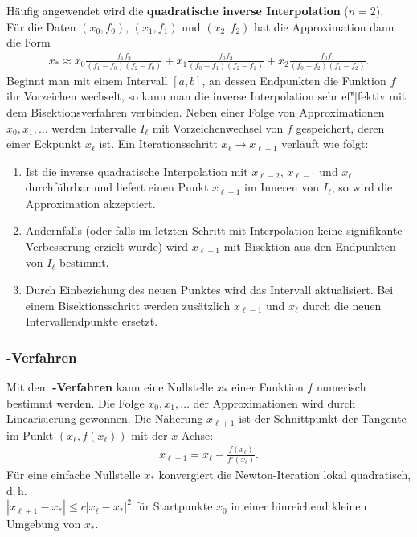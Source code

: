 Häufig angewendet wird die
\textbf{quadratische inverse Interpolation} ($n = 2$). \\
Für die Daten $(x_0, f_0)$, $(x_1, f_1)$ und $(x_2, f_2)$ hat die
Approximation dann die Form
\begin{align*}
    x_\ast \approx
    x_0 \frac{f_1 f_2}{(f_1 - f_0)(f_2 - f_0)} +
    x_1 \frac{f_0 f_2}{(f_0 - f_1)(f_2 - f_1)} +
    x_2 \frac{f_0 f_1}{(f_0 - f_2)(f_1 - f_2)}.
\end{align*}
Beginnt man mit einem Intervall $[a, b]$, an dessen Endpunkten
die Funktion $f$ ihr Vorzeichen wechselt, so kann man die inverse Interpolation
sehr ef"|fektiv mit dem Bisektionsverfahren verbinden.
Neben einer Folge von Approximationen $x_0, x_1, \dotsc$ werden Intervalle
$I_\ell$ mit Vorzeichenwechsel von $f$ gespeichert, deren einer
Eckpunkt $x_\ell$ ist. Ein Iterationsschritt $x_\ell \rightarrow x_{\ell+1}$
verläuft wie folgt:
\begin{enumerate}
    \item
    Ist die inverse quadratische Interpolation mit $x_{\ell-2}$, $x_{\ell-1}$
    und $x_\ell$ durchführbar und liefert einen Punkt $x_{\ell+1}$ im Inneren
    von $I_\ell$, so wird die Approximation akzeptiert.
    
    \item
    Andernfalls (oder falls im letzten Schritt mit Interpolation keine
    signifikante Verbesserung erzielt wurde) wird $x_{\ell+1}$ mit Bisektion
    aus den Endpunkten von $I_\ell$ bestimmt.
    
    \item
    Durch Einbeziehung des neuen Punktes wird das Intervall aktualisiert.
    Bei einem Bisektionsschritt werden zusätzlich $x_{\ell-1}$ und $x_\ell$
    durch die neuen Intervallendpunkte ersetzt.
\end{enumerate}

\pagebreak

\subsubsection{%
    -Verfahren%
}

Mit dem \textbf{-Verfahren} kann eine Nullstelle $x_\ast$ einer
Funktion $f$ numerisch bestimmt werden.
Die Folge $x_0, x_1, \dotsc$ der Approximationen wird durch Linearisierung
gewonnen.
Die Näherung $x_{\ell+1}$ ist der Schnittpunkt der Tangente im
Punkt $(x_\ell, f(x_\ell))$ mit der $x$-Achse:
\begin{align*}
    x_{\ell+1} = x_\ell - \frac{f(x_\ell)}{f'(x_\ell)}.
\end{align*}
Für eine einfache Nullstelle $x_\ast$ konvergiert die Newton-Iteration
lokal quadratisch, d.\,h. \\
$|x_{\ell+1} - x_\ast| \le c |x_\ell - x_\ast|^2$
für Startpunkte $x_0$ in einer hinreichend kleinen Umgebung von $x_\ast$.

